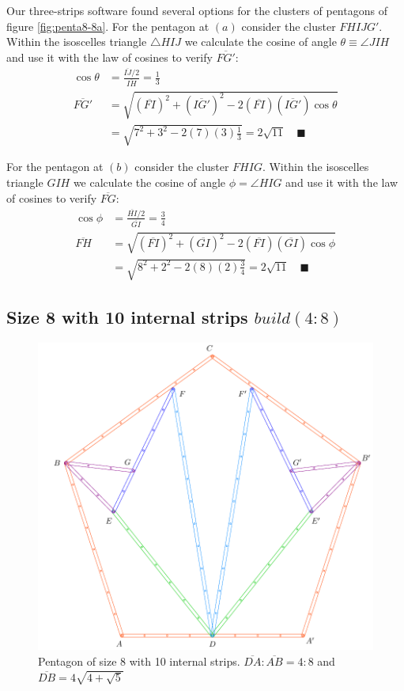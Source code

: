 \documentclass[11pt]{article}
\begin{document}
Our three-strips software found several options for the clusters of pentagons of figure \ref{fig:penta8-8a}. For the pentagon at $(a)$ consider the cluster $FHIJG'$. Within the isoscelles triangle $\triangle{HIJ}$ we calculate the cosine of angle $\theta \equiv \angle{JIH}$ and use it with the law of cosines to verify $\overline{FG'}$:
\begin{align}
\cos\theta &= \frac{\overline{IJ}/2}{\overline{IH}} = \frac{1}3 \nonumber\\
\overline{FG'} &= \sqrt{(\overline{FI})^2 + (\overline{IG'})^2 
 - 2(\overline{FI})(\overline{IG'})\cos\theta} \nonumber\\
 &= \sqrt{7^2 + 3^2 - 2(7)(3)\frac{1}3} = 2\sqrt{11} \quad\blacksquare
\end{align}

For the pentagon at $(b)$ consider the cluster $FHIG$. Within the isoscelles triangle $GIH$ we calculate the cosine of angle $\phi = \angle{HIG}$ and use it with the law of cosines to verify $\overline{FG}$:
\begin{align}
\cos\phi &= \frac{\overline{HI}/2}{\overline{GI}} = \frac{3}4 \nonumber\\
\overline{FH} &= \sqrt{(\overline{FI})^2 + (\overline{GI})^2
 - 2(\overline{FI})(\overline{GI})\cos\phi} \nonumber\\
 &= \sqrt{8^2 + 2^2 - 2(8)(2)\frac{3}4} = 2\sqrt{11} \quad\blacksquare
\end{align}

\subsection{Size 8 with 10 internal strips $build(4:8)$}

\begin{figure}[h]
\centering
\includegraphics[scale=1]{8/penta8-10a}
\caption{Pentagon of size 8 with 10 internal strips. $\overline{DA}:\overline{AB} = 4:8$ and $\overline{DB} = 4\sqrt{4 + \sqrt5}$}
\label{fig:penta8-10a}
\end{figure}
\end{document}
